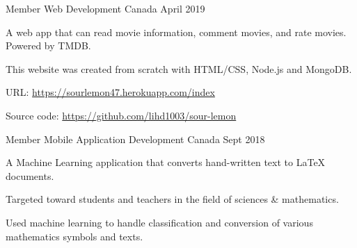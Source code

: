 \begin{cventries}

  \cventry
    {Member} %
    {Web Development} %
    {Canada} %
    {April 2019} %
    {
      \begin{cvitems} %
        \item {A web app that can read movie information, comment movies, and rate movies. Powered by TMDB. }
        \item {This website was created from scratch with HTML/CSS, Node.js and MongoDB.}
        \item {URL: \url{https://sourlemon47.herokuapp.com/index}}
        \item {Source code: \url{https://github.com/lihd1003/sour-lemon}}
      \end{cvitems}
    }

  \cventry
    {Member} %
    {Mobile Application Development} %
    {Canada} %
    {Sept 2018} %
    {
      \begin{cvitems} %
        \item {A Machine Learning application that converts hand-written text to LaTeX documents.}
        \item {Targeted toward students and teachers in the field of sciences & mathematics.}
        \item {Used machine learning to handle classification and conversion of various mathematics symbols and texts.}\
        \item {}
        \item {}
      \end{cvitems}
    }


\end{cventries}
